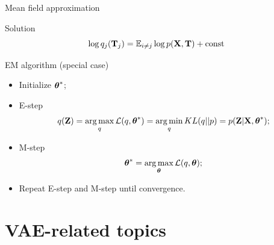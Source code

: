 \begin{frame}{Mean field approximation}
    \begin{block}{Solution}
    \[
        \log q_j(\mathbf{T}_j) = \mathbb{E}_{i \neq j} \log p(\mathbf{X}, \mathbf{T}) + \text{const}
    \]
    \end{block}

	\begin{block}{EM algorithm (special case)}
	\begin{itemize}
		\item Initialize $\boldsymbol{\theta}^*$;
		\item E-step
		\[
			q(\mathbf{Z}) = \operatorname*{arg\,max}_q \mathcal{L} (q, \boldsymbol{\theta}^*) = \operatorname*{arg\,min}_q KL(q || p) =
			 p(\mathbf{Z}| \mathbf{X}, \boldsymbol{\theta}^*);
		\]
		\item M-step
		\[
			\boldsymbol{\theta}^* = \operatorname*{arg\,max}_{\boldsymbol{\theta}} \mathcal{L} (q, \boldsymbol{\theta});
		\]
		\item Repeat E-step and M-step until convergence.
	\end{itemize}
	\end{block}
\end{frame}
\section{VAE-related topics}

